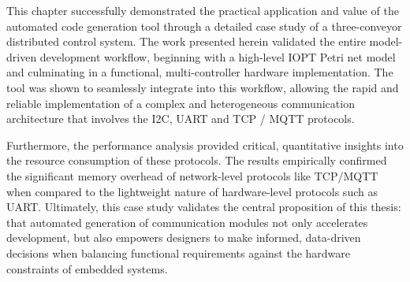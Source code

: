 This chapter successfully demonstrated the practical application and value of the automated code generation tool through a detailed case study of a three-conveyor distributed control system. The work presented herein validated the entire model-driven development workflow, beginning with a high-level IOPT Petri net model and culminating in a functional, multi-controller hardware implementation. The tool was shown to seamlessly integrate into this workflow, allowing the rapid and reliable implementation of a complex and heterogeneous communication architecture that involves the I2C, UART and TCP / MQTT protocols.

Furthermore, the performance analysis provided critical, quantitative insights into the resource consumption of these protocols. The results empirically confirmed the significant memory overhead of network-level protocols like TCP/MQTT when compared to the lightweight nature of hardware-level protocols such as UART. Ultimately, this case study validates the central proposition of this thesis: that automated generation of communication modules not only accelerates development, but also empowers designers to make informed, data-driven decisions when balancing functional requirements against the hardware constraints of embedded systems.